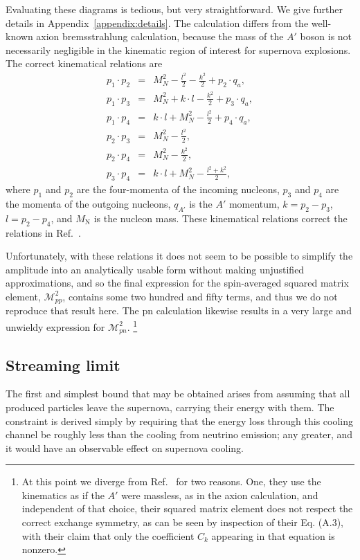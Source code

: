 \documentclass[nofootinbib,prd,superscriptaddress,twocolumn]{revtex4}
\newcommand{\bea}{\begin{eqnarray}}
\newcommand{\eea}{\end{eqnarray}}
\newcommand{\qa}{q_{A'}}
\begin{document}
Evaluating these diagrams is tedious, but very straightforward. We give further details in Appendix~\ref{appendix:details}. 
The calculation differs from the well-known axion bremsstrahlung calculation, because the mass of the $A'$ boson is not 
necessarily negligible in the kinematic region of interest for supernova explosions.
The correct kinematical relations are 
%
\bea 
p_1 \cdot p_2 &=& M_N^2 - \frac{l^2}{2} - \frac{k^2}{2} + p_2 \cdot q_a,\\
p_1 \cdot p_3 &=& M_N^2 + k \cdot l - \frac{k^2}{2} + p_3 \cdot q_a,\\  
p_1 \cdot p_4 &=& k \cdot l + M_N^2 - \frac{l^2}{2} + p_4 \cdot q_a, \\
p_2 \cdot p_3 &=& M_N^2 - \frac{l^2}{2}, \\ 
p_2 \cdot p_4 &=& M_N^2 - \frac{k^2}{2},\\
p_3 \cdot p_4 &=& k \cdot l + M_N^2 - \frac{l^2 + k^2}{2},
\eea
%
where $p_1$ and $p_2$ are the four-momenta of the incoming nucleons, $p_3$ and $p_4$ are the momenta 
of the outgoing nucleons, $\qa$ is the $A'$ momentum, $k=p_2 - p_3$, $l=p_2 - p_4$, and $M_{\mathrm{N}}$ 
is the nucleon mass. These kinematical relations correct the relations in Ref.~\cite{dent_etal12}.

Unfortunately, with these relations it does not seem to be possible to simplify the amplitude into an analytically usable form without making unjustified approximations, and so the final expression for the spin-averaged squared matrix element, $ \mathcal{M}^2_{pp}$, contains some two hundred and fifty terms, and thus we do not reproduce that result here. The pn calculation likewise results in a very large and unwieldy expression for $ \mathcal{M}^2_{pn}$. \footnote{At this point we diverge from Ref.~\cite{dent_etal12} for two reasons.  One, they use the kinematics as if the $A'$ were massless, as in the axion calculation, and independent of that choice, their squared matrix element does not respect the correct exchange symmetry, as can be seen by inspection of their Eq. (A.3), with their claim that only the coefficient $C_k$ appearing in that equation is nonzero.}


\subsection{Streaming limit}
The first and simplest bound that may be obtained arises from assuming that all produced particles leave the supernova, carrying their energy with them. The constraint is derived simply by requiring that the energy loss through this cooling channel be roughly less than the cooling from neutrino emission; any greater, and it would have an observable effect on supernova cooling.
\end{document}
